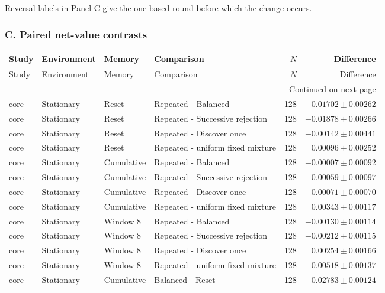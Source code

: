 Reversal labels in Panel C give the one-based round before which the change occurs.

\subsubsection*{C. Paired net-value contrasts}
\begingroup\footnotesize\setlength{\tabcolsep}{4pt}

\renewcommand{\arraystretch}{1.0}
\begin{longtable}{@{}lp{.19\linewidth}lp{.29\linewidth}rr@{}}
\toprule Study & Environment & Memory & Comparison & $N$ & Difference \\\midrule\endfirsthead
\toprule Study & Environment & Memory & Comparison & $N$ & Difference \\\midrule\endhead
\midrule\multicolumn{6}{r}{Continued on next page}\\\endfoot
\bottomrule\endlastfoot
core & Stationary & Reset & Repeated - Balanced & 128 & $-0.01702 \pm 0.00262$ \\
core & Stationary & Reset & Repeated - Successive rejection & 128 & $-0.01878 \pm 0.00266$ \\
core & Stationary & Reset & Repeated - Discover once & 128 & $-0.00142 \pm 0.00441$ \\
core & Stationary & Reset & Repeated - uniform fixed mixture & 128 & $0.00096 \pm 0.00252$ \\
core & Stationary & Cumulative & Repeated - Balanced & 128 & $-0.00007 \pm 0.00092$ \\
core & Stationary & Cumulative & Repeated - Successive rejection & 128 & $-0.00059 \pm 0.00097$ \\
core & Stationary & Cumulative & Repeated - Discover once & 128 & $0.00071 \pm 0.00070$ \\
core & Stationary & Cumulative & Repeated - uniform fixed mixture & 128 & $0.00343 \pm 0.00117$ \\
core & Stationary & Window 8 & Repeated - Balanced & 128 & $-0.00130 \pm 0.00114$ \\
core & Stationary & Window 8 & Repeated - Successive rejection & 128 & $-0.00212 \pm 0.00115$ \\
core & Stationary & Window 8 & Repeated - Discover once & 128 & $0.00254 \pm 0.00166$ \\
core & Stationary & Window 8 & Repeated - uniform fixed mixture & 128 & $0.00518 \pm 0.00137$ \\
core & Stationary & Cumulative & Balanced - Reset & 128 & $0.02783 \pm 0.00124$ \\

\end{longtable}
